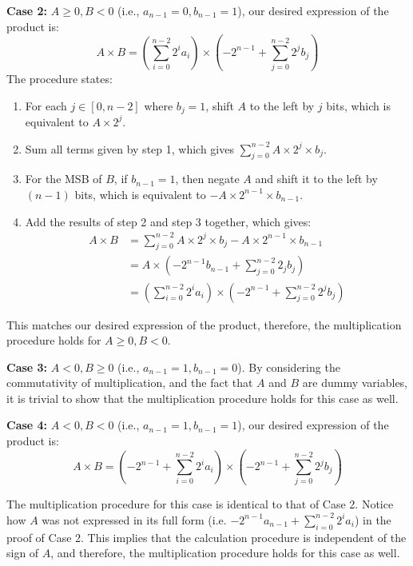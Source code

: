 \documentclass[answers]{exam}
\begin{document}
\begin{questions}
\begin{solution}
        \textbf{Case 2:} $A \geq 0, B < 0$ (i.e., $a_{n-1} = 0, b_{n-1} = 1$), our desired expression of the product is:
        \begin{equation}
            A\times B = \left(\sum_{i=0}^{n-2} 2^i a_i\right) \times \left(-2^{n-1} + \sum_{j=0}^{n-2} 2^j b_j\right)
        \end{equation}
        The procedure states: \begin{enumerate}
            \item For each $j \in [0, n-2]$ where $b_j = 1$, shift $A$ to the left by $j$ bits, which is equivalent to $A \times 2^j$.
            \item Sum all terms given by step 1, which gives $\sum_{j=0}^{n-2} A \times 2^j \times b_j$.
            \item For the MSB of $B$, if $b_{n-1} = 1$, then negate $A$ and shift it to the left by $(n-1)$ bits, which is equivalent to $-A \times 2^{n-1} \times b_{n-1}$.
            \item Add the results of step 2 and step 3 together, which gives:
            \begin{align*}
                A\times B &= \sum_{j=0}^{n-2} A \times 2^j \times b_j - A \times 2^{n-1} \times b_{n-1} \\
                &= A \times \left(-2^{n-1}b_{n-1} + \sum_{j=0}^{n-2}2_jb_j\right) \\
                &= \left(\sum_{i=0}^{n-2} 2^i a_i\right) \times \left(-2^{n-1} + \sum_{j=0}^{n-2} 2^j b_j\right)
            \end{align*}
        \end{enumerate}
        This matches our desired expression of the product, therefore,
        the multiplication procedure holds for $A \geq 0, B < 0$.

        \textbf{Case 3:} $A < 0, B \geq 0$ (i.e., $a_{n-1} = 1, b_{n-1} = 0$). By considering the commutativity of multiplication,
        and the fact that $A$ and $B$ are dummy variables, it is trivial to show that the multiplication procedure holds for this case as well.

        \textbf{Case 4:} $A < 0, B < 0$ (i.e., $a_{n-1} = 1, b_{n-1} = 1$), our desired expression of the product is:
        \begin{equation}
            A\times B = \left(-2^{n-1} + \sum_{i=0}^{n-2} 2^i a_i\right) \times \left(-2^{n-1} + \sum_{j=0}^{n-2} 2^j b_j\right)
        \end{equation}

        The multiplication procedure for this case is identical to that of Case 2.
        Notice how $A$ was not expressed in its full form (i.e. $-2^{n-1}a_{n-1} + \sum_{i=0}^{n-2} 2^i a_i$)
        in the proof of Case 2. This implies that the calculation procedure is independent of the sign of $A$,
        and therefore, the multiplication procedure holds for this case as well.


\end{solution}
\end{questions}
\end{document}
